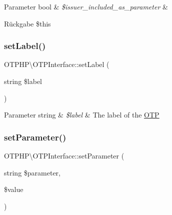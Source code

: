 \begin{DoxyParams}[1]{Parameter}
bool & {\em \$issuer\+\_\+included\+\_\+as\+\_\+parameter} & \\
\hline
\end{DoxyParams}
\begin{DoxyReturn}{Rückgabe}
\$this 
\end{DoxyReturn}
\mbox{\label{interface_o_t_p_h_p_1_1_o_t_p_interface_a0cbf5bc9ceef09f331bad8842b2ca3ce}} 
\subsubsection{\texorpdfstring{set\+Label()}{setLabel()}}
{\footnotesize\ttfamily O\+T\+P\+H\+P\textbackslash{}\+O\+T\+P\+Interface\+::set\+Label (\begin{DoxyParamCaption}\item[{string}]{\$label }\end{DoxyParamCaption})}


\begin{DoxyParams}[1]{Parameter}
string & {\em \$label} & The label of the \mbox{\hyperlink{class_o_t_p_h_p_1_1_o_t_p}{O\+TP}} \\
\hline
\end{DoxyParams}
\mbox{\label{interface_o_t_p_h_p_1_1_o_t_p_interface_a7b2673de7bc53ea83beb65a1ad53a53c}} 
\subsubsection{\texorpdfstring{set\+Parameter()}{setParameter()}}
{\footnotesize\ttfamily O\+T\+P\+H\+P\textbackslash{}\+O\+T\+P\+Interface\+::set\+Parameter (\begin{DoxyParamCaption}\item[{string}]{\$parameter,  }\item[{}]{\$value }\end{DoxyParamCaption})}



